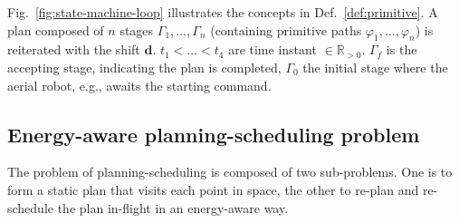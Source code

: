 \documentclass[letterpaper,10pt,journal,twoside]{IEEEtran}
\theoremstyle{definition}
\begin{document}

Fig.~\ref{fig:state-machine-loop} illustrates  the concepts in Def.~\ref{def:primitive}. A plan composed of $n$ stages $\Gamma_1,\dots,\Gamma_n$ (containing primitive paths $\varphi_1,\dots,\varphi_n$) is reiterated with the shift $\mathbf{d}$. $t_1<\dots<t_4$ are time instant $\in\mathbb{R}_{> 0}$. $\Gamma_f$ is the accepting stage, indicating the plan is completed, $\Gamma_0$ the initial stage where the aerial robot, e.g., awaits the starting command.

\vspace*{-2ex}
\subsection{Energy-aware planning-scheduling problem}
\label{sec:pbfor}

The problem of planning-scheduling is composed of two sub-problems. One is to form a static plan that visits each point in space, the other to re-plan and re-schedule the plan in-flight in an energy-aware way.
\end{document}
